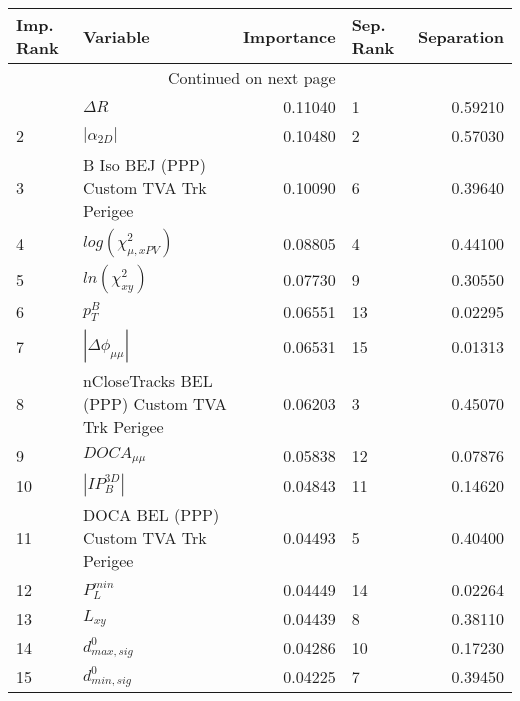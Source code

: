 \usepackage{lscape}

\begin{landscape}
\begin{longtable}{llrlr}
\toprule
Imp. Rank &                                       Variable &  Importance & Sep. Rank &  Separation \\
\midrule
\endhead
\midrule
\multicolumn{3}{r}{{Continued on next page}} \\
\midrule
\endfoot

\bottomrule
\endlastfoot
        1 &                                     $\Delta R$ &     0.11040 &         1 &     0.59210 \\
        2 &                                $|\alpha_{2D}|$ &     0.10480 &         2 &     0.57030 \\
        3 &         B Iso BEJ (PPP) Custom TVA Trk Perigee &     0.10090 &         6 &     0.39640 \\
        4 &                      $log(\chi^{2}_{\mu,xPV})$ &     0.08805 &         4 &     0.44100 \\
        5 &                            $ln(\chi^{2}_{xy})$ &     0.07730 &         9 &     0.30550 \\
        6 &                                      $p^B_{T}$ &     0.06551 &        13 &     0.02295 \\
        7 &                       $|\Delta \phi_{\mu\mu}|$ &     0.06531 &        15 &     0.01313 \\
        8 &  nCloseTracks BEL (PPP) Custom TVA Trk Perigee &     0.06203 &         3 &     0.45070 \\
        9 &                                $DOCA_{\mu\mu}$ &     0.05838 &        12 &     0.07876 \\
       10 &                                $|IP_{B}^{3D}|$ &     0.04843 &        11 &     0.14620 \\
       11 &          DOCA BEL (PPP) Custom TVA Trk Perigee &     0.04493 &         5 &     0.40400 \\
       12 &                                  $P^{min}_{L}$ &     0.04449 &        14 &     0.02264 \\
       13 &                                       $L_{xy}$ &     0.04439 &         8 &     0.38110 \\
       14 &                               $d^0_{max, sig}$ &     0.04286 &        10 &     0.17230 \\
       15 &                               $d^0_{min, sig}$ &     0.04225 &         7 &     0.39450 \\
\end{longtable}

\end{landscape}

